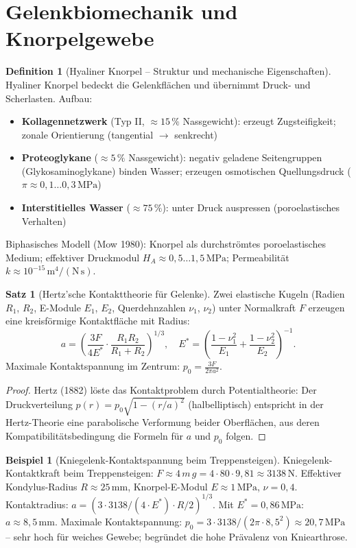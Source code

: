 ﻿\documentclass[a4paper,12pt]{report}
\theoremstyle{definition}
\newtheorem{definition}{Definition}
\newtheorem{beispiel}{Beispiel}
\newtheorem{satz}{Satz}
\begin{document}
\section{Gelenkbiomechanik und Knorpelgewebe}

\begin{definition}[Hyaliner Knorpel -- Struktur und mechanische Eigenschaften]
Hyaliner Knorpel bedeckt die Gelenkflächen und übernimmt Druck- und Scherlasten.
Aufbau:
\begin{itemize}
    \item[-] \textbf{Kollagennetzwerk} (Typ II, $\approx 15\,\%$ Nassgewicht):
          erzeugt Zugsteifigkeit; zonale Orientierung (tangential $\to$ senkrecht)
    \item[-] \textbf{Proteoglykane} ($\approx 5\,\%$ Nassgewicht):
          negativ geladene Seitengruppen (Glykosaminoglykane) binden Wasser;
          erzeugen osmotischen Quellungsdruck ($\pi \approx 0{,}1\ldots0{,}3\,\mathrm{MPa}$)
    \item[-] \textbf{Interstitielles Wasser} ($\approx 75\,\%$):
          unter Druck auspressen (poroelastisches Verhalten)
\end{itemize}
Biphasisches Modell (Mow 1980): Knorpel als durchströmtes poroelastisches
Medium; effektiver Druckmodul $H_A \approx 0{,}5\ldots1{,}5\,\mathrm{MPa}$;
Permeabilität $k \approx 10^{-15}\,\mathrm{m^4/(N\,s)}$.
\end{definition}

\begin{satz}[Hertz'sche Kontakttheorie für Gelenke]
Zwei elastische Kugeln (Radien $R_1$, $R_2$, E-Module $E_1$, $E_2$,
Querdehnzahlen $\nu_1$, $\nu_2$) unter Normalkraft $F$ erzeugen eine
kreisförmige Kontaktfläche mit Radius:
\[
  a = \left(\frac{3F}{4E^*}\cdot\frac{R_1 R_2}{R_1+R_2}\right)^{1/3},
  \quad E^* = \left(\frac{1-\nu_1^2}{E_1}+\frac{1-\nu_2^2}{E_2}\right)^{-1}.
\]
Maximale Kontaktspannung im Zentrum:
$p_0 = \frac{3F}{2\pi a^2}$.
\end{satz}
\begin{proof}
Hertz (1882) löste das Kontaktproblem durch Potentialtheorie:
Der Druckverteilung $p(r) = p_0\sqrt{1-(r/a)^2}$ (halbelliptisch)
entspricht in der Hertz-Theorie eine parabolische Verformung beider Oberflächen,
aus deren Kompatibilitätsbedingung die Formeln für $a$ und $p_0$ folgen.
\end{proof}

\begin{beispiel}[Kniegelenk-Kontaktspannung beim Treppensteigen]
Kniegelenk-Kontaktkraft beim Treppensteigen: $F \approx 4\,m\,g = 4\cdot80\cdot9{,}81 \approx 3138\,\mathrm{N}$.
Effektiver Kondylus-Radius $R \approx 25\,\mathrm{mm}$, Knorpel-E-Modul $E \approx 1\,\mathrm{MPa}$, $\nu = 0{,}4$.
Kontaktradius: $a = (3\cdot3138/(4\cdot E^*)\cdot R/2)^{1/3}$.
Mit $E^* = 0{,}86\,\mathrm{MPa}$: $a \approx 8{,}5\,\mathrm{mm}$.
Maximale Kontaktspannung: $p_0 = 3\cdot3138/(2\pi\cdot8{,}5^2) \approx 20{,}7\,\mathrm{MPa}$ --
sehr hoch für weiches Gewebe; begründet die hohe Prävalenz von Kniearthrose.
\end{beispiel}
\end{document}
